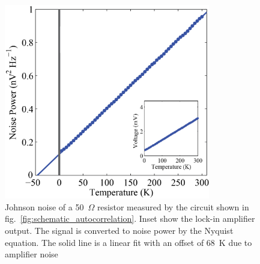\begin{figure}
\centering
\includegraphics[width = 90mm]{figures/Johnson_noise_thermometry/Auto_noise_vs_T.png}
\caption{Johnson noise of a 50~$\Omega$ resistor measured by the circuit shown in fig.~\ref{fig:schematic_autocorrelation}. Inset show the lock-in amplifier output. The signal is converted to noise power by the Nyquist equation. The solid line is a linear fit with an offset of 68~K due to amplifier noise}
\label{fig:auto_noise_vs_T}
\end{figure}

